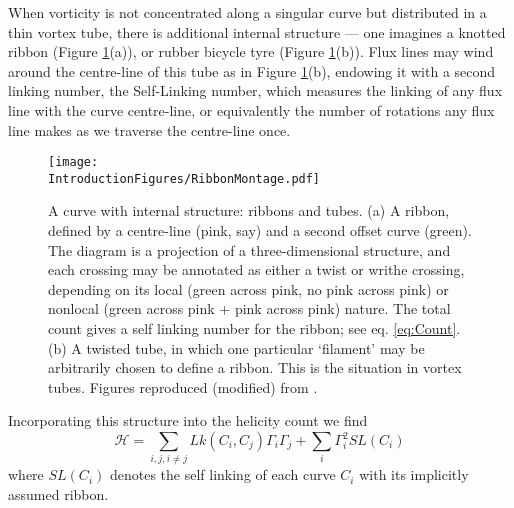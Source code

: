 When vorticity is not concentrated along a singular curve but distributed in a thin vortex tube, there is additional internal structure --- one imagines a knotted ribbon (Figure \ref{fig:RibbonMontage}(a)), or rubber bicycle tyre (Figure \ref{fig:RibbonMontage}(b)). Flux lines may wind around the centre-line of this tube as in Figure \ref{fig:RibbonMontage}(b), endowing it with a second linking number, the Self-Linking number, which measures the linking of any flux line with the curve centre-line, or equivalently the number of rotations any flux line makes as we traverse the centre-line once. 
\begin{figure}[htbp]
\centering
\texttt{[image: \\IntroductionFigures/RibbonMontage.pdf]}
\caption{A curve with internal structure: ribbons and tubes. (a) A ribbon, defined by a centre-line (pink, say) and a second offset curve (green). The diagram is a projection of a three-dimensional structure, and each crossing may be annotated as either a twist or writhe crossing, depending on its local (green across pink, no pink across pink) or nonlocal (green across pink + pink across pink) nature. The total count gives a self linking number for the ribbon; see eq. \ref{eq:Count}. (b) A twisted tube, in which one particular `filament' may be arbitrarily chosen to define a ribbon. This is the situation in vortex tubes. Figures reproduced (modified) from \citep{Dennis2005,Moffat1992}.}
\label{fig:RibbonMontage}
\end{figure}
Incorporating this structure into the helicity count we find \citep{Moffat1992}
\begin{equation}
    \mathcal{H} = \sum_{i,j, i\neq j} Lk(C_i,C_j) \Gamma_i \Gamma_j + \sum_{i} \Gamma_i^2 SL(C_i) 
    \label{eq:HelicityCount}
\end{equation}
where $SL(C_i)$ denotes the self linking of each curve $C_i$ with its implicitly assumed ribbon. 

